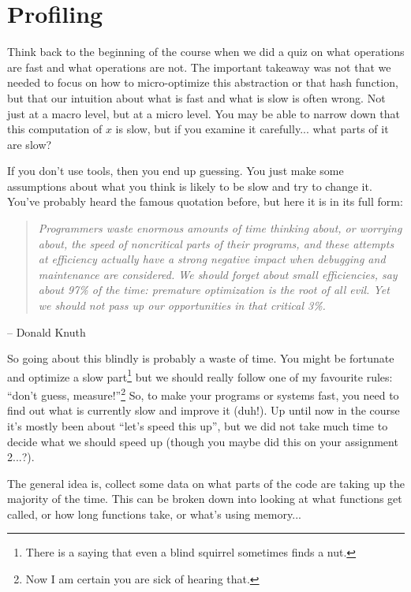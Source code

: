 




\section*{Profiling}

Think back to the beginning of the course when we did a quiz on what operations are fast and what operations are not. The important takeaway was not that we needed to focus on how to micro-optimize this abstraction or that hash function, but that our intuition about what is fast and what is slow is often wrong. Not just at a macro level, but at a micro level. You may be able to narrow down that this computation of $x$ is slow, but if you examine it carefully... what parts of it are slow?

If you don't use tools, then you end up guessing. You just make some assumptions about what you think is likely to be slow and try to change it. You've probably heard the famous quotation before, but here it is in its full form:

\begin{quote}
\textit{Programmers waste enormous amounts of time thinking about, or worrying about, the speed of noncritical parts of their programs, and these attempts at efficiency actually have a strong negative impact when debugging and maintenance are considered. We should forget about small efficiencies, say about 97\% of the time: premature optimization is the root of all evil. Yet we should not pass up our opportunities in that critical 3\%.}
\end{quote}
	\hfill -- Donald Knuth

So going about this blindly is probably a waste of time. You might be fortunate and optimize a slow part\footnote{There is a saying that even a blind squirrel sometimes finds a nut.} but we should really follow one of my favourite rules: ``don't guess, measure!''\footnote{Now I am certain you are sick of hearing that.} So, to make your programs or systems fast, you need to find out what is currently slow and improve it (duh!). Up until now in the course it's mostly been about ``let's speed this up'', but we did not take much time to decide what we should speed up (though you maybe did this on your assignment 2...?).

The general idea is, collect some data on what parts of the code are taking up the majority of the time. This can be broken down into looking at what functions get called, or how long functions take, or what's using memory...

